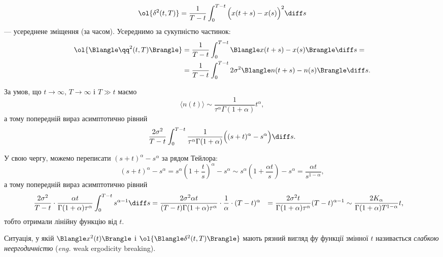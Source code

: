 \begin{equation}
    \ol{\delta^2(t, T)}
    = \frac{1}{T - t} \int_0^{T - t} \Big( x(t + s) - x(s) \Big)^2 \diff s
\end{equation}
--- усереднене зміщення (за часом). Усереднимо за сукупністю частинок:
\begin{equation}
    \begin{aligned}
        \ol{\Blangle \qq^2(t, T) \Brangle}
        &= \frac{1}{T - t} \int_0^{T - t} \Blangle x(t + s) - x(s) \Brangle \diff s = \\
        &= \frac{1}{T - t} \int_0^{T - t} 2 \sigma^2 \Blangle n(t + s) - n(s) \Brangle \diff s.
    \end{aligned}
\end{equation}

За умов, що $t \to \infty$, $T \to \infty$ і $T \gg t$ маємо
\begin{equation}
    \langle n(t) \rangle
    \sim \frac{1}{\tau^\alpha \Gamma(1 + \alpha)} t^\alpha,
\end{equation}
а тому попередній вираз асимптотично рівний
\begin{equation}
    \frac{2 \sigma^2}{T - t} \int_0^{T - t} \frac{1}{\tau^\alpha \Gamma(1 + \alpha)} \Big( (s + t)^\alpha - s^\alpha \Big) \diff s.
\end{equation}

У свою чергу, можемо переписати $(s + t)^\alpha - s^\alpha$ за рядом Тейлора:
\begin{equation}
    (s + t)^\alpha - s^\alpha
    = s^\alpha \left( 1 + \frac{t}{s} \right)^\alpha - s^\alpha
    \sim s^\alpha \left( 1 + \frac{\alpha t}{s} \right) - s^\alpha
    = \frac{\alpha t}{s^{1 - \alpha}},
\end{equation}
а тому попередній вираз асимптотично рівний
\begin{equation}
    \begin{aligned}
        \frac{2 \sigma^2}{T - t} \cdot \frac{\alpha t}{\Gamma(1 + \alpha) \tau^\alpha} \int_0^{T - t} s^{\alpha - 1} \diff s
        &= \frac{2 \sigma^2 \alpha t}{(T - t) \Gamma(1 + \alpha) \tau^\alpha} \cdot \frac{1}{\alpha} \cdot (T - t)^\alpha
        &= \frac{2 \sigma^2 t}{\Gamma(1 + \alpha) \tau^\alpha} (T - t)^{\alpha - 1}
        &\sim \frac{2 K_\alpha}{\Gamma(1 + \alpha) T^{1 - \alpha}} t,
    \end{aligned}
\end{equation}
тобто отримали лінійну функцію від $t$. \medskip

\begin{definition}
    Ситуація, у якій $\Blangle x^2(t) \Brangle$ і $\ol{\Blangle \delta^2(t, T) \Brangle}$ мають рязний вигляд фу функції змінної $t$ називається \textit{слабкою неергодичністю} (\textit{eng.} weak ergodicity breaking).
\end{definition}

